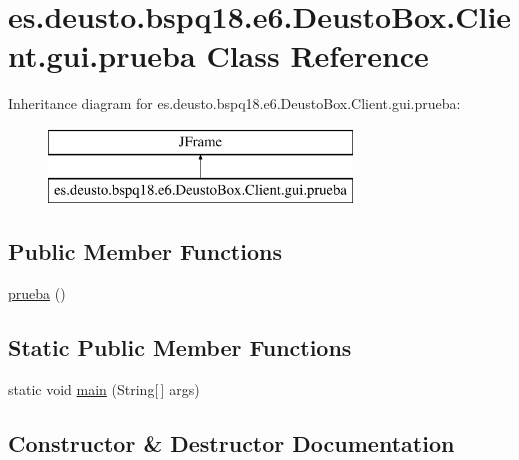 \hypertarget{classes_1_1deusto_1_1bspq18_1_1e6_1_1_deusto_box_1_1_client_1_1gui_1_1prueba}{}\section{es.\+deusto.\+bspq18.\+e6.\+Deusto\+Box.\+Client.\+gui.\+prueba Class Reference}
\label{classes_1_1deusto_1_1bspq18_1_1e6_1_1_deusto_box_1_1_client_1_1gui_1_1prueba}
Inheritance diagram for es.\+deusto.\+bspq18.\+e6.\+Deusto\+Box.\+Client.\+gui.\+prueba\+:\begin{figure}[H]
\begin{center}
\leavevmode
\includegraphics[height=2.000000cm]{classes_1_1deusto_1_1bspq18_1_1e6_1_1_deusto_box_1_1_client_1_1gui_1_1prueba}
\end{center}
\end{figure}
\subsection*{Public Member Functions}
\begin{DoxyCompactItemize}
\item 
\mbox{\hyperlink{classes_1_1deusto_1_1bspq18_1_1e6_1_1_deusto_box_1_1_client_1_1gui_1_1prueba_a8638430e12846eb242870acb5aa676d1}{prueba}} ()
\end{DoxyCompactItemize}
\subsection*{Static Public Member Functions}
\begin{DoxyCompactItemize}
\item 
static void \mbox{\hyperlink{classes_1_1deusto_1_1bspq18_1_1e6_1_1_deusto_box_1_1_client_1_1gui_1_1prueba_a35ce3684431b0cb30bed0468eeff815d}{main}} (String\mbox{[}$\,$\mbox{]} args)
\end{DoxyCompactItemize}


\subsection{Constructor \& Destructor Documentation}
\mbox{\label{classes_1_1deusto_1_1bspq18_1_1e6_1_1_deusto_box_1_1_client_1_1gui_1_1prueba_a8638430e12846eb242870acb5aa676d1}} 
